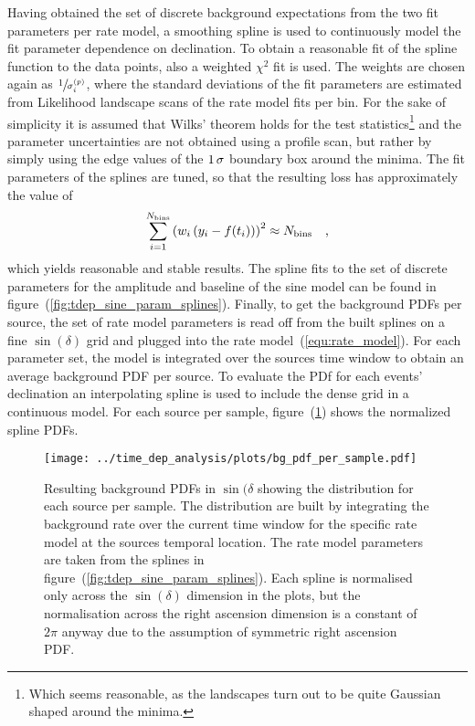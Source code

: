 Having obtained the set of discrete background expectations from the two fit parameters per rate model, a smoothing spline is used to continuously model the fit parameter dependence on declination.
To obtain a reasonable fit of the spline function to the data points, also a weighted $\chi^2$ fit is used.
The weights are chosen again as $\sfrac{1}{\sigma_i^{(p)}}$, where the standard deviations of the fit parameters are estimated from Likelihood landscape scans of the rate model fits per bin.
For the sake of simplicity it is assumed that Wilks' theorem holds for the test statistics\footnote{Which seems reasonable, as the landscapes turn out to be quite Gaussian shaped around the minima.} and the parameter uncertainties are not obtained using a profile scan, but rather by simply using the edge values of the $\num{1}\,\sigma$ boundary box around the minima.
The fit parameters of the splines are tuned, so that the resulting loss has approximately the value of
\begin{equation}
  \sum_{i=1}^{N_\text{bins}} \left(w_i\left(y_i - f(t_i)\right)\right)^2
  \approx N_\text{bins}
  \quad\text{,}
\end{equation}
which yields reasonable and stable results.
The spline fits to the set of discrete parameters for the amplitude and baseline of the sine model can be found in figure~(\ref{fig:tdep_sine_param_splines}).
Finally, to get the background PDFs per source, the set of rate model parameters is read off from the built splines on a fine $\sin(\delta)$ grid and plugged into the rate model~(\ref{equ:rate_model}).
For each parameter set, the model is integrated over the sources time window to obtain an average background PDF per source.
To evaluate the PDf for each events' declination an interpolating spline is used to include the dense grid in a continuous model.
For each source per sample, figure~(\ref{fig:tdep_bg_pdf_per_sample}) shows the normalized spline PDFs.

\begin{figure}[htbp]
  \centering
  \texttt{[image: ../time\_dep\_analysis/plots/bg\_pdf\_per\_sample.pdf]}
  \caption[Background PDFs per source per sample for the time-dependent analysis]{
    Resulting background PDFs in $\sin(\delta$ showing the distribution for each source per sample.
    The distribution are built by integrating the background rate over the current time window for the specific rate model at the sources temporal location.
    The rate model parameters are taken from the splines in figure~(\ref{fig:tdep_sine_param_splines}).
    Each spline is normalised only across the $\sin(\delta)$ dimension in the plots, but the normalisation across the right ascension dimension is a constant of $2\pi$ anyway due to the assumption of symmetric right ascension PDF.
  }
  \label{fig:tdep_bg_pdf_per_sample}
\end{figure}

